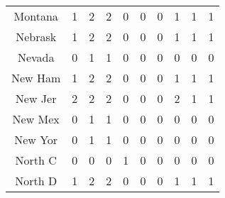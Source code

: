 \begin{longtable}{cp{1.5cm}p{1.5cm}p{1.5cm}p{1.5cm}p{1.5cm}p{1.5cm}p{1.5cm}p{1.5cm}p{1.5cm}}
Montana &                          1 &                             2 &                          2 &                        0 &                           0 &                        0 &                         1 &                            1 &                         1 \\
Nebrask &                          1 &                             2 &                          2 &                        0 &                           0 &                        0 &                         1 &                            1 &                         1 \\
Nevada  &                          0 &                             1 &                          1 &                        0 &                           0 &                        0 &                         0 &                            0 &                         0 \\
New Ham &                          1 &                             2 &                          2 &                        0 &                           0 &                        0 &                         1 &                            1 &                         1 \\
New Jer &                          2 &                             2 &                          2 &                        0 &                           0 &                        0 &                         2 &                            1 &                         1 \\
New Mex &                          0 &                             1 &                          1 &                        0 &                           0 &                        0 &                         0 &                            0 &                         0 \\
New Yor &                          0 &                             1 &                          1 &                        0 &                           0 &                        0 &                         0 &                            0 &                         0 \\
North C &                          0 &                             0 &                          0 &                        1 &                           0 &                        0 &                         0 &                            0 &                         0 \\
North D &                          1 &                             2 &                          2 &                        0 &                           0 &                        0 &                         1 &                            1 &                         1 \\

\end{longtable}
